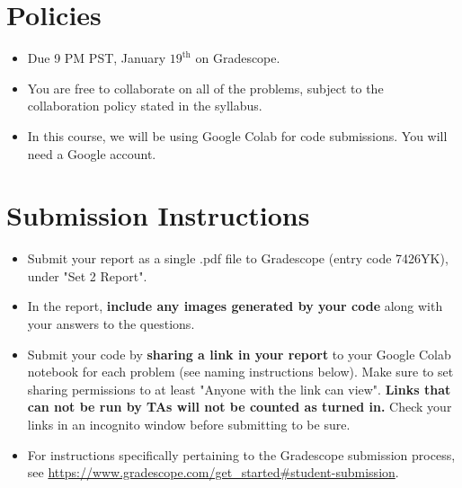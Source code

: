 \newif\ifshowsolutions
\showsolutionstrue







\pagestyle{fancy}




\section*{Policies}
\begin{itemize}
	\item Due 9 PM PST, January $19^\text{th}$ on Gradescope. 
	\item You are free to collaborate on all of the problems, subject to the collaboration policy stated in the syllabus.
	\item In this course, we will be using Google Colab for code submissions. You will need a Google account.
\end{itemize}

\section*{Submission Instructions}
\begin{itemize}
	\item Submit your report as a single .pdf file to Gradescope (entry code 7426YK), under "Set 2 Report". 
	\item In the report, \textbf{include any images generated by your code} along with your answers to the questions.
	\item Submit your code by \textbf{sharing a link in your report} to your Google Colab notebook for each problem (see naming instructions below). Make sure to set sharing permissions to at least "Anyone with the link can view". \textbf{Links that can not be run by TAs will not be counted as turned in.} Check your links in an incognito window before submitting to be sure. 
	\item For instructions specifically pertaining to the Gradescope submission process, see \url{https://www.gradescope.com/get_started#student-submission}.
\end{itemize}


